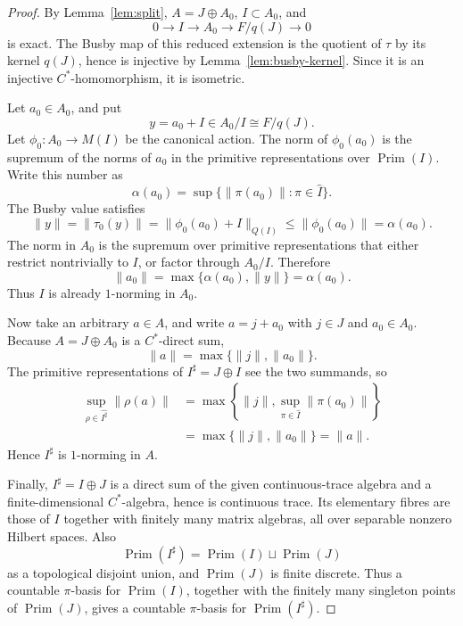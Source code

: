 \documentclass[11pt]{article}
\newcommand{\Prim}{\operatorname{Prim}}
\begin{document}
\begin{proof}
By Lemma~\ref{lem:split}, \(A=J\oplus A_0\), \(I\subset A_0\), and
\[
        0\longrightarrow I\longrightarrow A_0
        \longrightarrow F/q(J)\longrightarrow0
\]
is exact.  The Busby map of this reduced extension is the quotient of
\(\tau\) by its kernel \(q(J)\), hence is injective by
Lemma~\ref{lem:busby-kernel}.  Since it is an injective \(C^*\)-homomorphism,
it is isometric.

Let \(a_0\in A_0\), and put
\[
        y=a_0+I\in A_0/I\cong F/q(J).
\]
Let \(\phi_0:A_0\to M(I)\) be the canonical action.  The norm of
\(\phi_0(a_0)\) is the supremum of the norms of \(a_0\) in the primitive
representations over \(\Prim(I)\).  Write this number as
\[
        \alpha(a_0)
        =
        \sup\{\|\pi(a_0)\|:\pi\in\widehat I\}.
\]
The Busby value satisfies
\[
        \|y\|
        =
        \|\tau_0(y)\|
        =
        \|\phi_0(a_0)+I\|_{Q(I)}
        \le
        \|\phi_0(a_0)\|
        =
        \alpha(a_0).
\]
The norm in \(A_0\) is the supremum over primitive representations that either
restrict nontrivially to \(I\), or factor through \(A_0/I\).  Therefore
\[
        \|a_0\|=\max\{\alpha(a_0),\|y\|\}=\alpha(a_0).
\]
Thus \(I\) is already \(1\)-norming in \(A_0\).

Now take an arbitrary \(a\in A\), and write \(a=j+a_0\) with \(j\in J\) and
\(a_0\in A_0\).  Because \(A=J\oplus A_0\) is a \(C^*\)-direct sum,
\[
        \|a\|=\max\{\|j\|,\|a_0\|\}.
\]
The primitive representations of \(I^\sharp=J\oplus I\) see the two summands,
so
\[
\begin{aligned}
        \sup_{\rho\in\widehat{I^\sharp}}\|\rho(a)\|
        &=
        \max\left\{
              \|j\|,
              \sup_{\pi\in\widehat I}\|\pi(a_0)\|
             \right\}  \\
        &=
        \max\{\|j\|,\|a_0\|\}
        =
        \|a\|.
\end{aligned}
\]
Hence \(I^\sharp\) is \(1\)-norming in \(A\).

Finally, \(I^\sharp=I\oplus J\) is a direct sum of the given continuous-trace
algebra and a finite-dimensional \(C^*\)-algebra, hence is continuous trace.
Its elementary fibres are those of \(I\) together with finitely many matrix
algebras, all over separable nonzero Hilbert spaces.  Also
\[
        \Prim(I^\sharp)=\Prim(I)\sqcup\Prim(J)
\]
as a topological disjoint union, and \(\Prim(J)\) is finite discrete.  Thus a
countable \(\pi\)-basis for \(\Prim(I)\), together with the finitely many
singleton points of \(\Prim(J)\), gives a countable \(\pi\)-basis for
\(\Prim(I^\sharp)\).
\end{proof}
\end{document}
